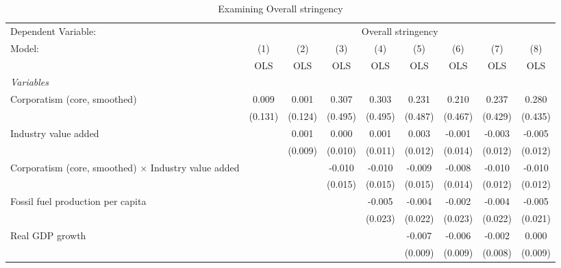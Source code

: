 
\begin{table}[htbp]
   \caption{Examining Overall stringency}
   \centering
   \begin{tabular}{lcccccccc}
      \toprule
      Dependent Variable: & \multicolumn{8}{c}{Overall stringency}\\
      Model:                                                      & (1)     & (2)     & (3)     & (4)     & (5)     & (6)     & (7)     & (8)\\  
                                                                  &  OLS    & OLS     & OLS     & OLS     & OLS     & OLS     & OLS     & OLS\\  
      \midrule
      \emph{Variables}\\
      Corporatism (core, smoothed)                                & 0.009   & 0.001   & 0.307   & 0.303   & 0.231   & 0.210   & 0.237   & 0.280\\   
                                                                  & (0.131) & (0.124) & (0.495) & (0.495) & (0.487) & (0.467) & (0.429) & (0.435)\\   
      Industry value added                                        &         & 0.001   & 0.000   & 0.001   & 0.003   & -0.001  & -0.003  & -0.005\\   
                                                                  &         & (0.009) & (0.010) & (0.011) & (0.012) & (0.014) & (0.012) & (0.012)\\   
      Corporatism (core, smoothed) $\times$ Industry value added  &         &         & -0.010  & -0.010  & -0.009  & -0.008  & -0.010  & -0.010\\   
                                                                  &         &         & (0.015) & (0.015) & (0.015) & (0.014) & (0.012) & (0.012)\\   
      Fossil fuel production per capita                           &         &         &         & -0.005  & -0.004  & -0.002  & -0.004  & -0.005\\   
                                                                  &         &         &         & (0.023) & (0.022) & (0.023) & (0.022) & (0.021)\\   
      Real GDP growth                                             &         &         &         &         & -0.007  & -0.006  & -0.002  & 0.000\\   
                                                                  &         &         &         &         & (0.009) & (0.009) & (0.008) & (0.009)\\   

\end{tabular}
\end{table}
